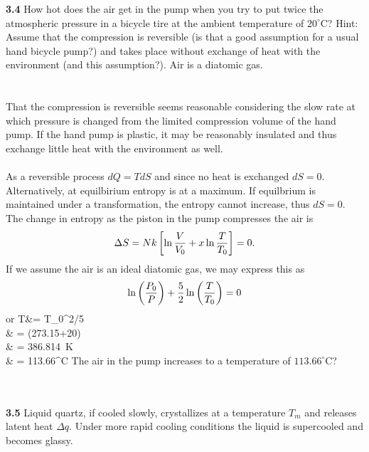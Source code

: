 \documentclass[11pt,letterpaper]{article}
\begin{document}
	\item[\textbf{3.4}]
	How hot does the air get in the pump when you try to put twice the atmospheric pressure in a bicycle tire at the ambient
	temperature of $20^\circ$C? Hint: Assume that the compression is reversible (is that a good assumption for a usual hand
	bicycle pump?) and takes place without exchange of heat with the environment (and this assumption?). Air is a diatomic gas.
	\\
	\\
	\\
	That the compression is reversible seems reasonable considering the slow rate at which pressure is changed from the limited 
	compression volume of the hand pump. If the hand pump is plastic, it may be reasonably insulated and thus exchange little
	heat with the environment as well. 
	\\
	\\
	As a reversible process $dQ = TdS$ and since no heat is exchanged $dS=0$. Alternatively, at equilbirium entropy is at a maximum. If 
	equilbrium is maintained under a transformation, the entropy cannot increase, thus $dS=0$. The change in entropy as the piston in
	the pump compresses the air is
	\[
		\Delta S = Nk\left[\ln \frac{V}{V_0}+x\ln \frac{T}{T_0}\right] = 0.
	\]	
	If we assume the air is an ideal diatomic gas, we may express this as
	\[
		\ln\left(\frac{P_0}{P}\right) +\frac{5}{2} \ln \left(\frac{T}{T_0}\right) = 0
	\]
	or
	\ba
		T&= T_0^{2/5}\\
		& = (273.15+20)\\
		& = 386.814\ \text K\\
		& = 113.66^\circ\text C
	\ea
	The air in the pump increases to a temperature of $113.66^\circ$C? 
	\\
	\\
	\\
	\item[\textbf{3.5}]
	Liquid quartz, if cooled slowly, crystallizes at a temperature $T_m$ and releases latent heat $\Delta q$. Under more rapid cooling 
	conditions the liquid is supercooled and becomes glassy.
	
\end{document}
